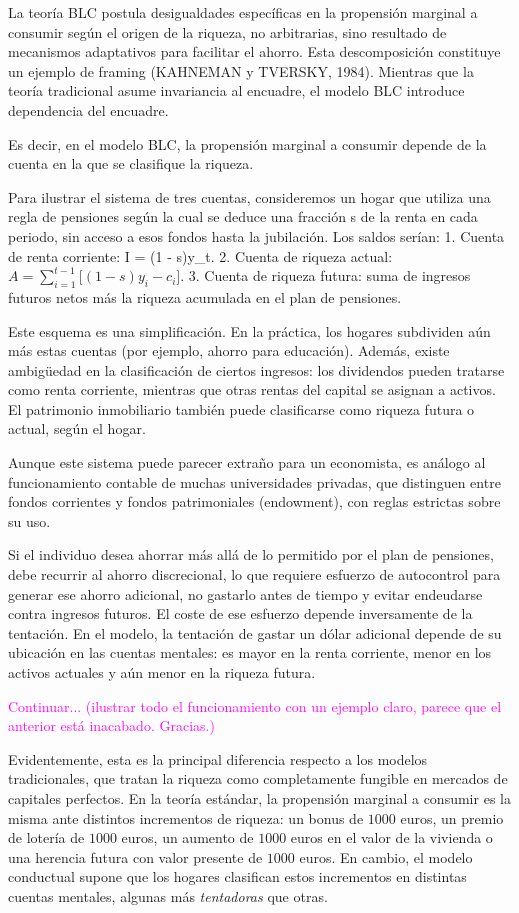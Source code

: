 \documentclass[10pt,a4paper]{article}
\begin{document}
La teoría BLC postula desigualdades específicas en la propensión marginal a consumir según el origen de la riqueza, no arbitrarias, sino resultado de mecanismos adaptativos para facilitar el ahorro. Esta descomposición constituye un ejemplo de framing (KAHNEMAN y TVERSKY, 1984). Mientras que la teoría tradicional asume invariancia al encuadre, el modelo BLC introduce dependencia del encuadre.

Es decir, en el modelo BLC, la propensión marginal a consumir depende de la cuenta en la que se clasifique la riqueza. 

Para ilustrar el sistema de tres cuentas, consideremos un hogar que utiliza una regla de pensiones según la cual se deduce una fracción s de la renta en cada periodo, sin acceso a esos fondos hasta la jubilación. Los saldos serían:
	1.	Cuenta de renta corriente: I = (1 - s)y_t.
	2.	Cuenta de riqueza actual: $A = \sum_{i=1}^{t-1} \big[(1 - s)y_i - c_i\big]$.
	3.	Cuenta de riqueza futura: suma de ingresos futuros netos más la riqueza acumulada en el plan de pensiones.

Este esquema es una simplificación. En la práctica, los hogares subdividen aún más estas cuentas (por ejemplo, ahorro para educación). Además, existe ambigüedad en la clasificación de ciertos ingresos: los dividendos pueden tratarse como renta corriente, mientras que otras rentas del capital se asignan a activos. El patrimonio inmobiliario también puede clasificarse como riqueza futura o actual, según el hogar.

Aunque este sistema puede parecer extraño para un economista, es análogo al funcionamiento contable de muchas universidades privadas, que distinguen entre fondos corrientes y fondos patrimoniales (endowment), con reglas estrictas sobre su uso.

Si el individuo desea ahorrar más allá de lo permitido por el plan de pensiones, debe recurrir al ahorro discrecional, lo que requiere esfuerzo de autocontrol para generar ese ahorro adicional, no gastarlo antes de tiempo y evitar endeudarse contra ingresos futuros. El coste de ese esfuerzo depende inversamente de la tentación. En el modelo, la tentación de gastar un dólar adicional depende de su ubicación en las cuentas mentales: es mayor en la renta corriente, menor en los activos actuales y aún menor en la riqueza futura.

\textcolor{magenta}{Continuar... (ilustrar todo el funcionamiento con un ejemplo claro, parece que el anterior está inacabado. Gracias.)}

Evidentemente, esta es la principal diferencia respecto a los modelos tradicionales, que tratan la riqueza como completamente fungible en mercados de capitales perfectos. En la teoría estándar, la propensión marginal a consumir es la misma ante distintos incrementos de riqueza: un bonus de $1000$ euros, un premio de lotería de $1000$ euros, un aumento de $1000$ euros en el valor de la vivienda o una herencia futura con valor presente de $1000$ euros. En cambio, el modelo conductual supone que los hogares clasifican estos incrementos en distintas cuentas mentales, algunas más \textit{tentadoras} que otras.
\end{document}

